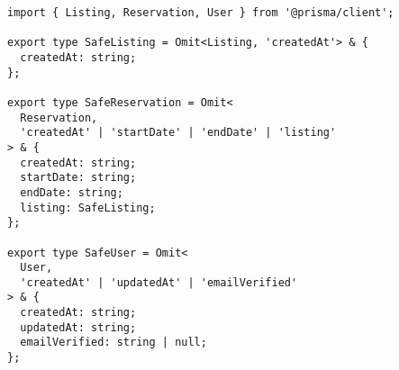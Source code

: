 \begin{verbatim}
import { Listing, Reservation, User } from '@prisma/client';

export type SafeListing = Omit<Listing, 'createdAt'> & {
  createdAt: string;
};

export type SafeReservation = Omit<
  Reservation,
  'createdAt' | 'startDate' | 'endDate' | 'listing'
> & {
  createdAt: string;
  startDate: string;
  endDate: string;
  listing: SafeListing;
};

export type SafeUser = Omit<
  User,
  'createdAt' | 'updatedAt' | 'emailVerified'
> & {
  createdAt: string;
  updatedAt: string;
  emailVerified: string | null;
};

\end{verbatim}